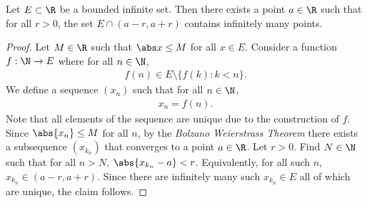 \documentclass{article}
\begin{document}
\begin{claim}
	Let $E\subset\R$ be a bounded infinite set.
	Then there exists a point $a\in\R$ such that for all $r>0$, the set
	$E\cap(a-r, a+r)$ contains infinitely many points.
\end{claim}
\begin{proof}
	Let $M\in\R$ such that $\abs x \leq M$ for all $x\in E$.
	Consider a function $f:\N\to E$ where for all $n\in\N$,
	\begin{align*}
		f(n) \in E \setminus \{f(k) : k < n\}.
	\end{align*}
	We define a sequence $(x_n)$ such that for all $n\in\N$,
	\begin{align*}
		x_n = f(n).
	\end{align*}
	Note that all elements of the sequence are unique due to the construction of $f$.
	Since $\abs{x_n}\leq M$ for all $n$, by the \emph{Bolzano Weierstrass Theorem} there exists a subsequence $(x_{k_n})$
	that converges to a point $a\in\R$. Let $r > 0$. Find $N\in\N$ such that for all $n>N$, $\abs{x_{k_n}-a}<r$. Equivalently,
	for all such $n$, $x_{k_n}\in(a-r, a+r)$. Since there are infinitely many such $x_{k_n}\in E$ all of which are unique,
	the claim follows.
\end{proof}
\end{document}
